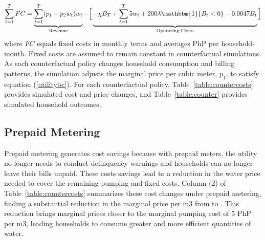 \documentclass[12pt,table]{article}
\begin{document}
\begin{align}
\label{utilitybc}
\sum_{t=1}^{T} FC = \underbrace{\sum_{t=1}^{T} (p_1+p_2 w_t)w_t}_{\text{Revenue}}  - \Big[ \underbrace{-\chi B_T +  \sum_{t=1}^{T} 5 w_t + 200 \lambda \mathbbm{1}\{B_t < 0 \} - 0.0047 B_t}_{\text{Operating Costs}} \Big]
\end{align}
where $FC$ equals fixed costs in monthly terms and averages PhP per household-month.  Fixed costs are assumed to remain constant in counterfactual simulations.  As each counterfactual policy changes household consumption and billing patterns, the simulation adjusts the marginal price per cubic meter, $p_1$, to satisfy equation (\ref{utilitybc}).  For each counterfactual policy, Table~\ref{table:countercosts} provides simulated cost and price changes, and Table~\ref{table:counter} provides simulated household outcomes.  




\subsection{Prepaid Metering}

Prepaid metering generates cost savings because with prepaid meters, the utility no longer needs to conduct delinquency warnings and households can no longer leave their bills unpaid.  These costs savings lead to a reduction in the water price needed to cover the remaining pumping and fixed costs.  Column (2) of Table~\ref{table:countercosts} summarizes these cost changes under prepaid metering, finding a substantial reduction in the marginal price per m3 from to \unskip.  This reduction brings marginal prices closer to the marginal pumping cost of 5 PhP per m3, leading households to consume greater and more efficient quantities of water.
\end{document}
